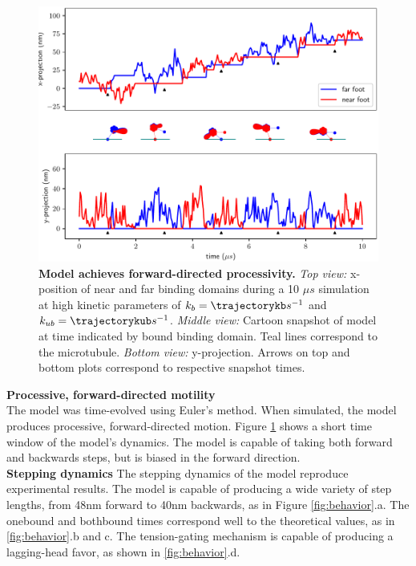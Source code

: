 \documentclass[9pt,twocolumn,twoside]{pnas-new}
\begin{document}
\begin{figure}[tbhp]
\centering
\includegraphics[width=\linewidth]{../../plots/paper_trajectory_plot.pdf}
\caption{\textbf{Model achieves forward-directed processivity.} \textit{Top view:} x-position of near and far binding domains during a 10 $\mu s$ simulation at high kinetic parameters of $k_b = \trajectorykb s^{-1}$ and $k_{ub} = \trajectorykub s^{-1}$. \textit{Middle view:} Cartoon snapshot of model at time indicated by bound binding domain. Teal lines correspond to the microtubule. \textit{Bottom view:} y-projection. Arrows on top and bottom plots correspond to respective snapshot times.}
\label{fig:trajectory}
\end{figure}

\textbf{Processive, forward-directed motility}\\
The model was time-evolved using Euler's method. When simulated, the model produces processive, forward-directed motion. Figure \ref{fig:trajectory} shows a short time window of the model's dynamics. The model is capable of taking both forward and backwards steps, but is biased in the forward direction.\\

\textbf{Stepping dynamics}
The stepping dynamics of the model reproduce experimental results. The model is capable of producing a wide variety of step lengths, from 48nm forward to 40nm backwards, as in Figure \ref{fig:behavior}.a. The onebound and bothbound times correspond well to the theoretical values, as in \ref{fig:behavior}.b and c. The tension-gating mechanism is capable of producing a lagging-head favor, as shown in \ref{fig:behavior}.d.
\end{document}
